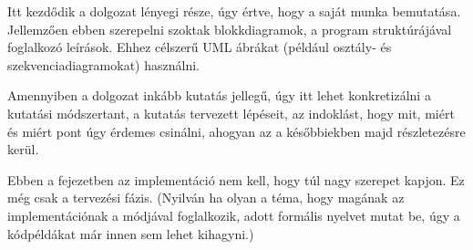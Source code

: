 
Itt kezdődik a dolgozat lényegi része, úgy értve, hogy a saját munka bemutatása.
Jellemzően ebben szerepelni szoktak blokkdiagramok, a program struktúrájával foglalkozó leírások.
Ehhez célszerű UML ábrákat (például osztály- és szekvenciadiagramokat) használni.

Amennyiben a dolgozat inkább kutatás jellegű, úgy itt lehet konkretizálni a kutatási módszertant, a kutatás tervezett lépéseit, az indoklást, hogy mit, miért és miért pont úgy érdemes csinálni, ahogyan az a későbbiekben majd részletezésre kerül.

Ebben a fejezetben az implementáció nem kell, hogy túl nagy szerepet kapjon.
Ez még csak a tervezési fázis.
(Nyilván ha olyan a téma, hogy magának az implementációnak a módjával foglalkozik, adott formális nyelvet mutat be, úgy a kódpéldákat már innen sem lehet kihagyni.)

